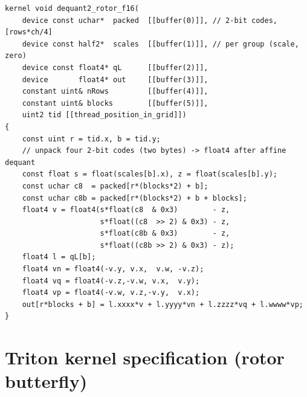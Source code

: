 \documentclass{article}
\begin{document}
\begin{lstlisting}[language=MSL,caption={Fused 2-bit dequant + rotor butterfly for the KV path.}]
kernel void dequant2_rotor_f16(
    device const uchar*  packed  [[buffer(0)]], // 2-bit codes, [rows*ch/4]
    device const half2*  scales  [[buffer(1)]], // per group (scale, zero)
    device const float4* qL      [[buffer(2)]],
    device       float4* out     [[buffer(3)]],
    constant uint& nRows         [[buffer(4)]],
    constant uint& blocks        [[buffer(5)]],
    uint2 tid [[thread_position_in_grid]])
{
    const uint r = tid.x, b = tid.y;
    // unpack four 2-bit codes (two bytes) -> float4 after affine dequant
    const float s = float(scales[b].x), z = float(scales[b].y);
    const uchar c8  = packed[r*(blocks*2) + b];
    const uchar c8b = packed[r*(blocks*2) + b + blocks];
    float4 v = float4(s*float(c8  & 0x3)        - z,
                      s*float((c8  >> 2) & 0x3) - z,
                      s*float(c8b & 0x3)        - z,
                      s*float((c8b >> 2) & 0x3) - z);
    float4 l = qL[b];
    float4 vn = float4(-v.y, v.x,  v.w, -v.z);
    float4 vq = float4(-v.z,-v.w, v.x,  v.y);
    float4 vp = float4(-v.w, v.z,-v.y,  v.x);
    out[r*blocks + b] = l.xxxx*v + l.yyyy*vn + l.zzzz*vq + l.wwww*vp;
}
\end{lstlisting}

\section{Triton kernel specification (rotor butterfly)}
\label{app:triton}
\end{document}
